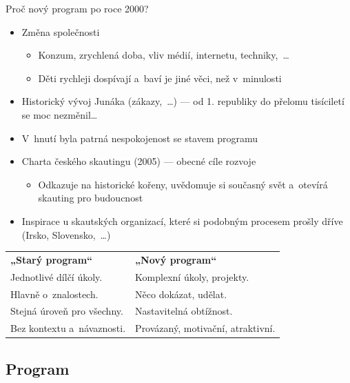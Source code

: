 \documentclass[compress, ucs, xelatex, xcolor=dvipsnames, print,
  hyperref={
    bookmarks=true,
    unicode=true,
    colorlinks=true,
    plainpages=false,
    pdfkeywords={Junak, Pedagogika, Skaut, Skauting, Vychovna metoda},
    linkcolor=Black,
    anchorcolor=Black,
    citecolor=OliveGreen,
    filecolor=OliveGreen,
    menucolor=Black,
    urlcolor=OliveGreen,
    pdftex}
  ]{beamer}
\begin{document}
\begin{frame}{Proč nový program po roce 2000?}
  \begin{itemize}
    \item Změna společnosti
    \begin{itemize}
      \item Konzum, zrychlená doba, vliv médií, internetu, techniky,~\ldots
      \item Děti rychleji dospívají a~baví je jiné věci, než v~minulosti
    \end{itemize}
    \item Historický vývoj Junáka (zákazy,~\ldots) --- od 1. republiky do přelomu tisíciletí se moc nezměnil\ldots
    \item V~hnutí byla patrná nespokojenost se stavem programu
    \item Charta českého skautingu (2005) --- obecné cíle rozvoje
    \begin{itemize}
      \item Odkazuje na historické kořeny, uvědomuje si současný svět a~otevírá skauting pro budoucnost
    \end{itemize}
    \item Inspirace u skautských organizací, které si podobným procesem prošly dříve (Irsko, Slovensko,~\ldots)
  \end{itemize}
  \begin{center}
    \begin{tabular}{ll}
      \textbf{„Starý program“} & \textbf{„Nový program“}\\
      Jednotlivé dílčí úkoly. & Komplexní úkoly, projekty.\\
      Hlavně o~znalostech. & Něco dokázat, udělat.\\
      Stejná úroveň pro všechny. & Nastavitelná obtížnost.\\
      Bez kontextu a~návaznosti. & Provázaný, motivační, atraktivní.
    \end{tabular}
  \end{center}
\end{frame}

\subsection{Program}
\end{document}
